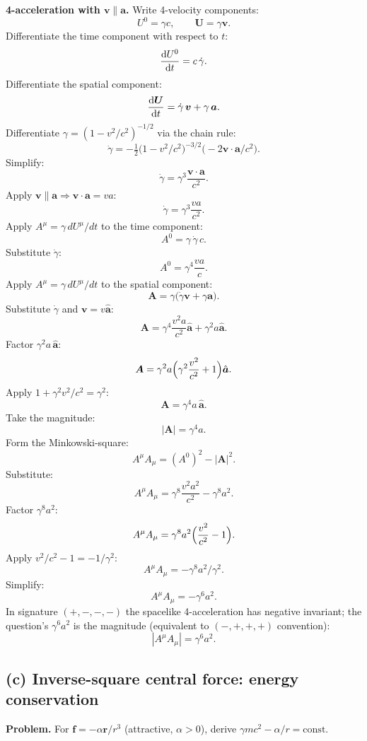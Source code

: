 \documentclass[11pt]{article}
\begin{document}
\noindent\textbf{4-acceleration with $\bm v\parallel\bm a$.} Write 4-velocity components:
\[ U^0=\gamma c,\qquad \bm U=\gamma\bm v. \]
Differentiate the time component with respect to $t$:
\[ \dv{U^0}{t} = c\,\dot\gamma. \]
Differentiate the spatial component:
\[ \dv{\bm U}{t} = \dot\gamma\,\bm v + \gamma\,\bm a. \]
Differentiate $\gamma=(1-v^2/c^2)^{-1/2}$ via the chain rule:
\[ \dot\gamma = -\tfrac{1}{2}\bigl(1-v^2/c^2\bigr)^{-3/2}\!\bigl(-2\bm v\!\cdot\!\bm a/c^2\bigr). \]
Simplify:
\[ \dot\gamma = \gamma^3 \frac{\bm v\!\cdot\!\bm a}{c^2}. \]
Apply $\bm v\parallel\bm a\Rightarrow \bm v\!\cdot\!\bm a = va$:
\[ \dot\gamma = \gamma^3 \frac{va}{c^2}. \]
Apply $A^\mu = \gamma\,dU^\mu/dt$ to the time component:
\[ A^0 = \gamma\,\dot\gamma\, c. \]
Substitute $\dot\gamma$:
\[ A^0 = \gamma^4\frac{va}{c}. \]
Apply $A^\mu = \gamma\,dU^\mu/dt$ to the spatial component:
\[ \bm A = \gamma\bigl(\dot\gamma\bm v + \gamma\bm a\bigr). \]
Substitute $\dot\gamma$ and $\bm v = v\hat{\bm a}$:
\[ \bm A = \gamma^4\frac{v^2 a}{c^2}\hat{\bm a} + \gamma^2 a\hat{\bm a}. \]
Factor $\gamma^2 a\,\hat{\bm a}$:
\[ \bm A = \gamma^2 a\Bigl(\gamma^2\frac{v^2}{c^2}+1\Bigr)\hat{\bm a}. \]
Apply $1+\gamma^2 v^2/c^2 = \gamma^2$:
\[ \bm A = \gamma^4 a\,\hat{\bm a}. \]
Take the magnitude:
\[ |\bm A|=\gamma^4 a. \]
Form the Minkowski-square:
\[ A^\mu A_\mu = (A^0)^2 - |\bm A|^2. \]
Substitute:
\[ A^\mu A_\mu = \gamma^8\frac{v^2 a^2}{c^2} - \gamma^8 a^2. \]
Factor $\gamma^8 a^2$:
\[ A^\mu A_\mu = \gamma^8 a^2\Bigl(\frac{v^2}{c^2}-1\Bigr). \]
Apply $v^2/c^2 - 1 = -1/\gamma^2$:
\[ A^\mu A_\mu = -\gamma^8 a^2/\gamma^2. \]
Simplify:
\[ A^\mu A_\mu = -\gamma^6 a^2. \]
In signature $(+,-,-,-)$ the spacelike 4-acceleration has negative invariant; the question's $\gamma^6 a^2$ is the magnitude (equivalent to $(-,+,+,+)$ convention):
\[ \boxed{\;|A^\mu A_\mu| = \gamma^6 a^2.\;} \]

\subsection*{(c) Inverse-square central force: energy conservation}

\textbf{Problem.} For $\bm f = -\alpha\bm r/r^3$ (attractive, $\alpha>0$), derive $\gamma mc^2 - \alpha/r = \text{const}$.
\end{document}
